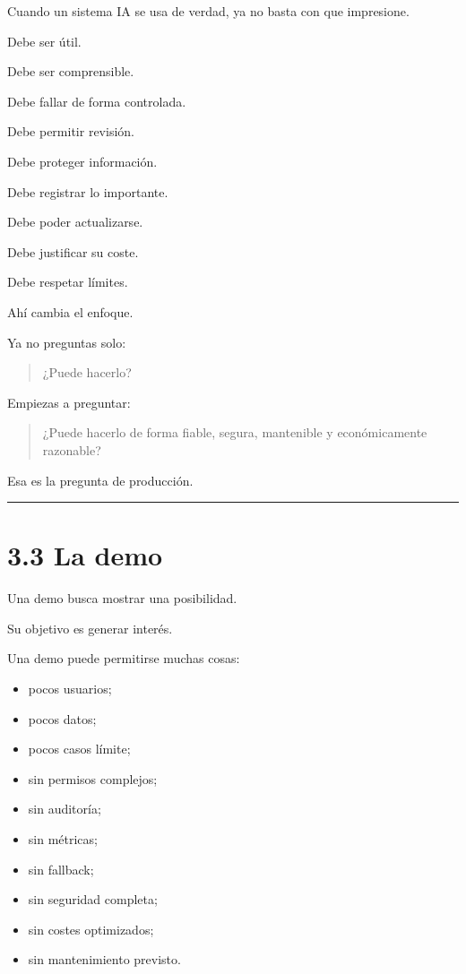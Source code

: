 Cuando un sistema IA se usa de verdad, ya no basta con que impresione.

Debe ser útil.

Debe ser comprensible.

Debe fallar de forma controlada.

Debe permitir revisión.

Debe proteger información.

Debe registrar lo importante.

Debe poder actualizarse.

Debe justificar su coste.

Debe respetar límites.

Ahí cambia el enfoque.

Ya no preguntas solo:

\begin{quote}
¿Puede hacerlo?
\end{quote}

Empiezas a preguntar:

\begin{quote}
¿Puede hacerlo de forma fiable, segura, mantenible y económicamente
razonable?
\end{quote}

Esa es la pregunta de producción.

\begin{center}\rule{0.5\linewidth}{0.5pt}\end{center}

\section{3.3 La demo}\label{la-demo}

Una demo busca mostrar una posibilidad.

Su objetivo es generar interés.

Una demo puede permitirse muchas cosas:

\begin{itemize}
\tightlist
\item
  pocos usuarios;
\item
  pocos datos;
\item
  pocos casos límite;
\item
  sin permisos complejos;
\item
  sin auditoría;
\item
  sin métricas;
\item
  sin fallback;
\item
  sin seguridad completa;
\item
  sin costes optimizados;
\item
  sin mantenimiento previsto.
\end{itemize}

